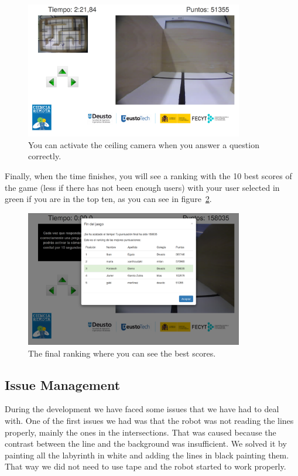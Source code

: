 \begin{figure}[!htbp]
	\centering
	\includegraphics[width=0.85\textwidth]{fig/manuals/trivia/romie-ceiling}
	\caption{You can activate the ceiling camera when you answer a question correctly.}
	\label{fig:man:romie_ceiling}
\end{figure}

Finally, when the time finishes, you will see a ranking with the 10 best scores of the game (less if
there has not been enough users) with your user selected in green if you are in the top ten, as you
can see in figure~\ref{fig:man:romie_ranking}.

\begin{figure}[!htbp]
	\centering
	\includegraphics[width=0.85\textwidth]{fig/manuals/trivia/romie-ranking}
	\caption{The final ranking where you can see the best scores.}
	\label{fig:man:romie_ranking}
\end{figure}

\subsection{Issue Management}

During the development we have faced some issues that we have had to deal with. One of the first
issues we had was that the robot was not reading the lines properly, mainly the ones in the
intersections. That was caused because the contrast between the line and the background was
insufficient. We solved it by painting all the labyrinth in white and adding the lines in black
painting them. That way we did not need to use tape and the robot started to work properly.

